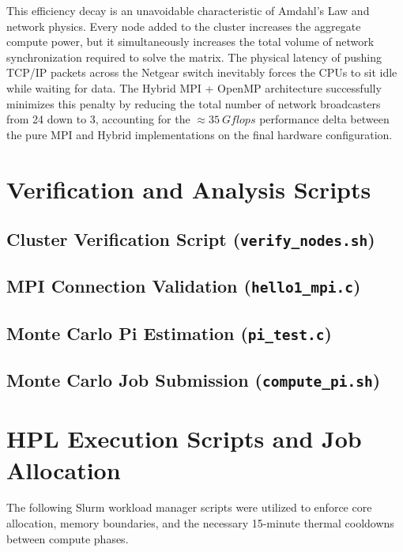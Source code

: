 \documentclass[11pt]{article}
\begin{document}
This efficiency decay is an unavoidable characteristic of Amdahl's Law and network physics. Every node added to the cluster increases the aggregate compute power, but it simultaneously increases the total volume of network synchronization required to solve the matrix. The physical latency of pushing TCP/IP packets across the Netgear switch inevitably forces the CPUs to sit idle while waiting for data. The Hybrid MPI + OpenMP architecture successfully minimizes this penalty by reducing the total number of network broadcasters from 24 down to 3, accounting for the $\approx \SI{35}{Gflops}$ performance delta between the pure MPI and Hybrid implementations on the final hardware configuration.

\newpage
\appendix

\section{Verification and Analysis Scripts}
\subsection{Cluster Verification Script (\texttt{verify\_nodes.sh})}


\subsection{MPI Connection Validation (\texttt{hello1\_mpi.c})}


\subsection{Monte Carlo Pi Estimation (\texttt{pi\_test.c})}


\subsection{Monte Carlo Job Submission (\texttt{compute\_pi.sh})}


\newpage
\section{HPL Execution Scripts and Job Allocation}
The following Slurm workload manager scripts were utilized to enforce core allocation, memory boundaries, and the necessary 15-minute thermal cooldowns between compute phases.
\end{document}
